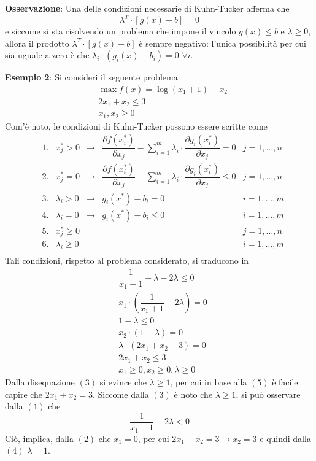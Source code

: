 \documentclass[a4paper]{extarticle}
\begin{document}
\vspace{2em}
\noindent
\textbf{Osservazione}: Una delle condizioni necessarie di Kuhn-Tucker afferma che
\[\lambda^T \cdot \left[g(x) - b\right]=0\]
e siccome si sta risolvendo un problema che impone il vincolo $g(x) \leq b$ e $\lambda \geq 0$, allora il prodotto $\lambda^T \cdot \left[g(x) - b\right]$ è sempre negativo: l'unica possibilità per cui sia uguale a zero è che $\lambda_i \cdot (g_i(x)-b_i) = 0$ $\forall i$.

\vspace{2em}
\noindent
\textbf{Esempio 2}: Si consideri il seguente problema
\begin{align*}
    &\max f(x) = \log(x_1+1)+x_2\\
    &2x_1 + x_2 \leq 3\\
    &x_1, x_2 \geq 0
\end{align*}
Com'è noto, le condizioni di Kuhn-Tucker possono essere scritte come
\begin{align*}
    &1.&x_j^* > 0 &\rightarrow& \dfrac{\partial f(x_i^*)}{\partial x_j} - \sum_{i=1}^m \lambda_i \cdot \dfrac{\partial g_i(x_i^*)}{\partial x_j} = 0 & j = 1,\dots,n\\
    &2.&x_j^* = 0 &\rightarrow& \dfrac{\partial f(x_i^*)}{\partial x_j} - \sum_{i=1}^m \lambda_i \cdot \dfrac{\partial g_i(x_i^*)}{\partial x_j} \leq 0 & j = 1,\dots,n\\
    &3.&\lambda_i > 0 &\rightarrow& g_i(x^*)-b_i=0 & i = 1,\dots,m\\
    &4.&\lambda_i = 0 &\rightarrow& g_i(x^*)-b_i \leq 0 & i = 1,\dots,m\\
    &5.&x_j^* \geq 0 & & & j= 1,\dots,n\\
    &6.&\lambda_i \geq 0 & & & i = 1,\dots,m\\
\end{align*}
Tali condizioni, rispetto al problema considerato, si traducono in
\begin{align}
    & \dfrac{1}{x_1+1} - \lambda - 2 \lambda \leq 0\\
    & x_1 \cdot \left(\dfrac{1}{x_1+1} - 2 \lambda\right) = 0\\
    & 1 - \lambda \leq 0\\
    & x_2 \cdot (1-\lambda) = 0\\
    & \lambda \cdot (2x_1+x_2-3) = 0\\
    & 2x_1+x_2 \leq 3\\
    & x_1 \geq 0, x_2 \geq 0, \lambda \geq 0
\end{align}
Dalla disequazione $(3)$ si evince che $\lambda \geq 1$, per cui in base alla $(5)$ è facile capire che $2x_1 + x_2 = 3$. Siccome dalla $(3)$ è noto che $\lambda \geq 1$, si può osservare dalla $(1)$ che
\[\dfrac{1}{x_1 + 1} - 2 \lambda < 0\]
Ciò, implica, dalla $(2)$ che $x_1=0$, per cui $2x_1+x_2=3 \rightarrow x_2=3$ e quindi dalla $(4)$ $\lambda=1$.
\end{document}
